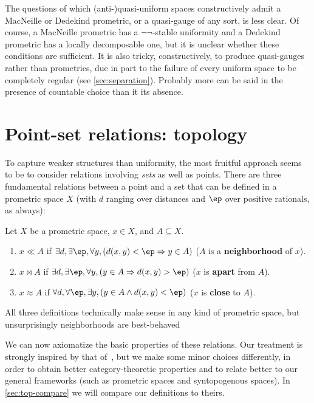 \documentclass{article}
\let\implies\Rightarrow
\def\nn{\ensuremath{\neg\neg}}
\begin{document}
The questions of which (anti-)quasi-uniform spaces constructively admit a MacNeille or Dedekind prometric, or a quasi-gauge of any sort, is less clear.
Of course, a MacNeille prometric has a \nn-stable uniformity and a Dedekind prometric has a locally decomposable one, but it is unclear whether these conditions are sufficient.
It is also tricky, constructively, to produce quasi-gauges rather than prometrics, due in part to the failure of every uniform space to be completely regular (see \cref{sec:separation}).
Probably more can be said in the presence of countable choice than it its absence.


\section{Point-set relations: topology}
\label{sec:point-set}
\label{sec:topology}

To capture weaker structures than uniformity, the most fruitful approach seems to be to consider relations involving \emph{sets} as well as points.
There are three fundamental relations between a point and a set that can be defined in a prometric space $X$ (with $d$ ranging over distances and $\ep$ over positive rationals, as always):

\begin{defn}\label{defn:toprels}
  Let $X$ be a prometric space, $x\in X$, and $A\subseteq X$.
  \begin{enumerate}
  \item $x\ll A$ if $\exists d, \exists \ep, \forall y, (d(x,y)<\ep \implies y\in A)$ ($A$ is a \textbf{neighborhood} of $x$).
  \item $x\bowtie A$ if $\exists d, \exists \ep, \forall y, (y\in A \implies d(x,y)>\ep)$ ($x$ is \textbf{apart} from $A$).
  \item $x\approx A$ if $\forall d, \forall \ep, \exists y, (y\in A \land d(x,y)<\ep)$ ($x$ is \textbf{close} to $A$).
  \end{enumerate}
\end{defn}

All three definitions technically make sense in any kind of prometric space, but unsurprisingly neighborhoods are best-behaved 

We can now axiomatize the basic properties of these relations.
Our treatment is strongly inspired by that of~\cite{bridges-vita}, but we make some minor choices differently, in order to obtain better category-theoretic properties and to relate better to our general frameworks (such as prometric spaces and syntopogenous spaces).
In \cref{sec:top-compare} we will compare our definitions to theirs.
\end{document}
